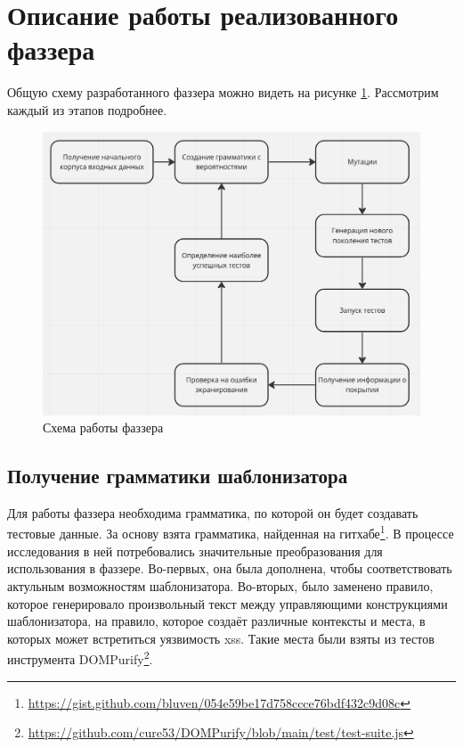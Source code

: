 \documentclass[a4paper]{article}
\begin{document}
\newpage
\section{Описание работы реализованного фаззера}
\indent

Общую схему разработанного фаззера можно видеть на рисунке \ref{FuzzerArch}. Рассмотрим каждый из этапов подробнее.
\begin{figure}[ht!]
    \includegraphics[width=180mm]{FuzzerArch.png}
    \caption{Схема работы фаззера}
    \label{FuzzerArch}
    \end{figure}


\subsection{Получение грамматики шаблонизатора}

Для работы фаззера необходима грамматика, по которой он будет создавать тестовые данные. За основу взята грамматика, найденная на гитхабе\footnote{\href{https://gist.github.com/bluven/054e59be17d758ccce76bdf432c9d08c}{https://gist.github.com/bluven/054e59be17d758ccce76bdf432c9d08c}}. В процессе исследования в ней потребовались значительные преобразования для использования в фаззере. Во-первых, она была дополнена, чтобы соответствовать актульным возможностям шаблонизатора. Во-вторых, было заменено правило, которое генерировало произвольный текст между управляющими конструкциями шаблонизатора, на правило, которое создаёт различные контексты и места, в которых может встретиться уязвимость xss. Такие места были взяты из тестов инструмента DOMPurify\footnote{\href{https://github.com/cure53/DOMPurify/blob/main/test/test-suite.js}{https://github.com/cure53/DOMPurify/blob/main/test/test-suite.js}}.
\end{document}
